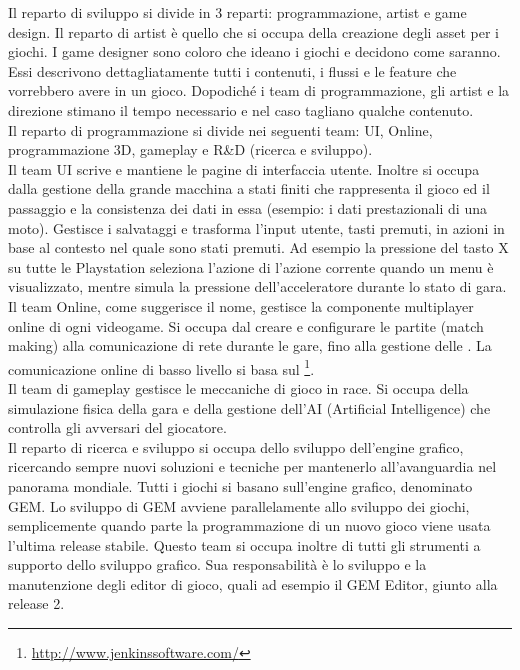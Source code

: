 
Il reparto di sviluppo si divide in 3 reparti: programmazione, artist e game design. Il reparto di artist è quello che si occupa della creazione degli asset per i giochi. I game designer sono coloro che ideano i giochi e decidono come saranno. Essi descrivono dettagliatamente tutti i contenuti, i flussi e le feature che vorrebbero avere in un gioco. Dopodiché i team di programmazione, gli artist e la direzione stimano il tempo necessario e nel caso tagliano qualche contenuto.\\

Il reparto di programmazione si divide nei seguenti team: UI, Online, programmazione 3D, gameplay e R\&D (ricerca e sviluppo).\\

Il team UI scrive e mantiene le pagine di interfaccia utente. Inoltre si occupa dalla gestione della grande macchina a stati finiti che rappresenta il gioco ed il passaggio e la consistenza dei dati in essa (esempio: i dati prestazionali di una moto). Gestisce i salvataggi e trasforma l'input utente, tasti premuti, in azioni in base al contesto nel quale sono stati premuti. Ad esempio la pressione del tasto X su tutte le Playstation\textsuperscript{\textregistered} seleziona l'azione di l'azione corrente quando un menu è visualizzato, mentre simula la pressione dell'acceleratore durante lo stato di gara.\\

Il team Online, come suggerisce il nome, gestisce la componente multiplayer online di ogni videogame. Si occupa dal creare e configurare le partite (match making) alla comunicazione di rete durante le gare, fino alla gestione delle . La comunicazione online di basso livello si basa sul  \footnote{\url{http://www.jenkinssoftware.com/}}.\\

Il team di gameplay gestisce le meccaniche di gioco in race. Si occupa della simulazione fisica della gara e della gestione dell'AI (Artificial Intelligence) che controlla gli avversari del giocatore.\\

Il reparto di ricerca e sviluppo si occupa dello sviluppo dell'engine grafico, ricercando sempre nuovi soluzioni e tecniche per mantenerlo all'avanguardia nel panorama mondiale. Tutti i giochi si basano sull'engine grafico, denominato GEM. Lo sviluppo di GEM avviene parallelamente allo sviluppo dei giochi, semplicemente quando parte la programmazione di un nuovo gioco viene usata l'ultima release stabile. Questo team si occupa inoltre di tutti gli strumenti a supporto dello sviluppo grafico. Sua responsabilità è lo sviluppo e la manutenzione degli editor di gioco, quali ad esempio il GEM Editor, giunto alla release 2.\\

